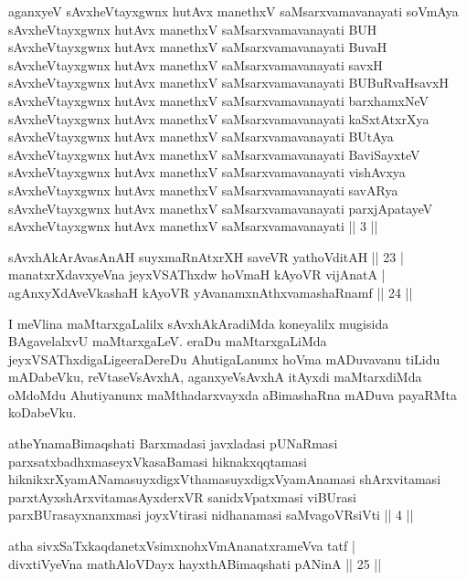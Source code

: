 \begin{kandikeshl}
aganxyeV sAvxheVtayxgwnx hutAvx manethxV saMsarxvamavanayati soVmAya sAvxheVtayxgwnx hutAvx manethxV saMsarxvamavanayati BUH sAvxheVtayxgwnx hutAvx manethxV saMsarxvamavanayati BuvaH sAvxheVtayxgwnx hutAvx manethxV saMsarxvamavanayati savxH sAvxheVtayxgwnx hutAvx manethxV saMsarxvamavanayati BUBuRvaHsavxH sAvxheVtayxgwnx hutAvx manethxV saMsarxvamavanayati barxhamxNeV sAvxheVtayxgwnx hutAvx manethxV saMsarxvamavanayati kaSxtAtxrXya sAvxheVtayxgwnx hutAvx manethxV saMsarxvamavanayati BUtAya sAvxheVtayxgwnx hutAvx manethxV saMsarxvamavanayati BaviSayxteV sAvxheVtayxgwnx hutAvx manethxV saMsarxvamavanayati vishAvxya sAvxheVtayxgwnx hutAvx manethxV saMsarxvamavanayati savARya sAvxheVtayxgwnx hutAvx manethxV saMsarxvamavanayati parxjApatayeV sAvxheVtayxgwnx hutAvx manethxV saMsarxvamavanayati || 3 ||
\end{kandikeshl}


\begin{shl}
sAvxhAkArAvasAnAH suyxmaRnAtxrXH saveVR yathoVditAH \hfill|| 23 | \\
manatxrXdavxyeVna jeyxVSAThxdw hoVmaH kAyoVR vijAnatA | \\
agAnxyXdAveVkashaH kAyoVR yAvanamxnAthxvamashaRnamf \hfill|| 24 || 
\end{shl}

\begin{artha}
I meVlina maMtarxgaLalilx sAvxhAkAradiMda koneyalilx mugisida BAgavelalxvU maMtarxgaLeV. eraDu maMtarxgaLiMda jeyxVSAThxdigaLige\break eraDereDu AhutigaLanunx hoVma mADuvavanu tiLidu mADabeVku, reVtaseVsAvxhA, aganxyeVsAvxhA itAyxdi maMtarxdiMda oMdoMdu Ahutiyanunx maMthadarxvayxda aBimashaRna mADuva payaRMta koDabeVku.
\end{artha}

\begin{kandikeshl}
atheYnamaBimaqshati Barxmadasi javxladasi pUNaRmasi parxsatxbadhxmaseyxVkasaBamasi hiknakxqqtamasi hiknikxrXyamANamasuyxdigxVthamasuyxdigxVyamAnamasi shArxvitamasi parxtAyxshArxvitamasAyxderxVR sanidxVpatxmasi viBUrasi parxBUrasayxnanxmasi joyxVtirasi nidhanamasi saMvagoVR\s siVti || 4 ||
\end{kandikeshl}


\begin{shl}
atha sivxSaTxkaqdanetxV\s simxnohxVmAnanatxrameVva tatf | \\
divxtiVyeVna mathA\s \s loVDayx hayxthABimaqshati pANinA \hfill|| 25 || 
\end{shl}

